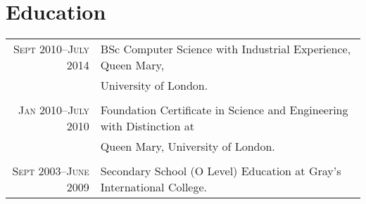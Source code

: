 \documentclass[a4paper,10pt]{article}
\begin{document}
\section{Education}
\begin{tabular}{rl}
  \textsc{Sept} 2010--\textsc{July} 2014 & BSc Computer Science with Industrial Experience, Queen
  Mary,\\& University of London.\\&\\

  \textsc{Jan} 2010--\textsc{July} 2010 & Foundation Certificate in Science and Engineering with
  Distinction at\\& Queen Mary, University of London.\\&\\

  \textsc{Sept} 2003--\textsc{June} 2009 & Secondary School (O Level) Education at Gray’s
  International College.
\end{tabular}

\end{document}
